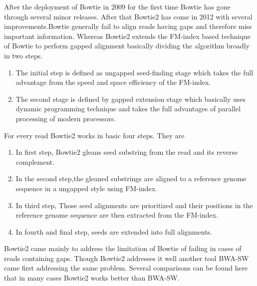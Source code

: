 \documentclass{standalone}
\begin{document}
After the deployment of Bowtie in 2009 for the first time Bowtie has gone through several minor releases. After that Bowtie2 has come in 2012\cite{bowtie2} with several improvements.Bowtie generally fail to align reads having gaps and therefore miss important information. Whereas Bowtie2 extends the FM-index based technique of Bowtie to perform gapped alignment  basically dividing the algorithm broadly in two steps.
\begin{enumerate}
	\item The initial step is defined as ungapped seed-finding stage which takes the full advantage from
	the speed and space efficiency of the FM-index.
	\item The second stage is defined by gapped extension stage which basically uses dynamic programming technique and takes the full advantages of parallel processing of modern processors.
\end{enumerate}
For every read Bowtie2 works in basic four steps. They are
\begin{enumerate}
	\item In first step, Bowtie2 gleans seed substring from the read and its reverse complement.
	\item In the second step,the gleaned substrings are aligned to a reference genome sequence in a ungapped style using FM-index.
	\item In third step, Those seed alignments are prioritized and their positions in the reference genome sequence are then extracted from the FM-index.
	\item In fourth and final step, seeds are extended into full alignments.
\end{enumerate}
Bowtie2 came mainly to address the limitation of Bowtie of failing in cases of reads containing gaps. Though Bowtie2 addresses it well another tool BWA-SW\cite{BWA_long} came first addressing the same problem. Several comparisons can be found here \cite{bowtie2} that in many cases Bowtie2 works better than BWA-SW.
\end{document}
